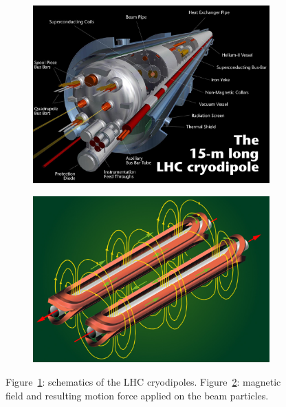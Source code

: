 	\begin{figure}[!h]
		\begin{subfigure}{\linewidth}
			\centering
			\includegraphics[width = 0.8\plotwidth]{fig/chapt2/LHC-dipole.jpg}\\
			\caption{\label{fig:LHCDipole:A}}
		\end{subfigure}
		\begin{subfigure}{\linewidth}
			\centering
			\includegraphics[width = 0.8\plotwidth]{fig/chapt2/LHC-dipole-field.jpg}
			\caption{\label{fig:LHCDipole:B}}
		\end{subfigure}
		\caption{\label{fig:LHCDipole} Figure~\ref{fig:LHCDipole:A}: schematics of the LHC cryodipoles. Figure~\ref{fig:LHCDipole:B}: magnetic field and resulting motion force applied on the beam particles.}
	\end{figure}
	
